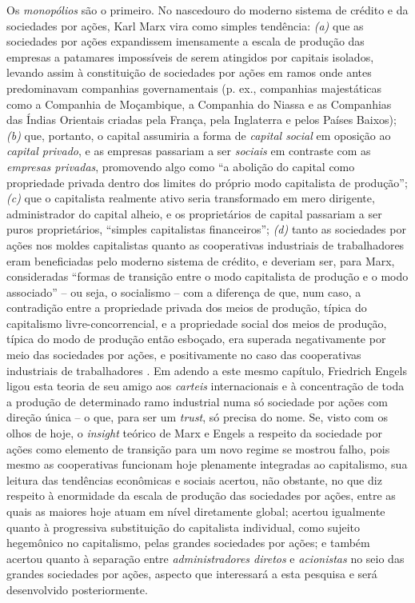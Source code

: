 Os \textit{monopólios} são o primeiro. No nascedouro do moderno sistema de crédito e da sociedades por ações, Karl Marx vira como simples tendência: \textit{(a)} que as sociedades por ações expandissem imensamente a escala de produção das empresas a patamares impossíveis de serem atingidos por capitais isolados, levando assim à constituição de sociedades por ações em ramos onde antes predominavam companhias governamentais (p. ex., companhias majestáticas como a Companhia de Moçambique, a Companhia do Niassa e as Companhias das Índias Orientais criadas pela França, pela Inglaterra e pelos Países Baixos); \textit{(b)} que, portanto, o capital assumiria a forma de \textit{capital social} em oposição ao \textit{capital privado}, e as empresas passariam a ser \textit{sociais} em contraste com as \textit{empresas privadas}, promovendo algo como ``a abolição do capital como propriedade privada dentro dos limites do próprio modo capitalista de produção''; \textit{(c)} que o capitalista realmente ativo seria transformado em mero dirigente, administrador do capital alheio, e os proprietários de capital passariam a ser puros proprietários, ``simples capitalistas financeiros''; \textit{(d)} tanto as sociedades por ações nos moldes capitalistas quanto as cooperativas industriais de trabalhadores eram beneficiadas pelo moderno sistema de crédito, e deveriam ser, para Marx, consideradas ``formas de transição entre o modo capitalista de produção e o modo associado'' -- ou seja, o socialismo -- com a diferença de que, num caso, a contradição entre a propriedade privada dos meios de produção, típica do capitalismo livre-concorrencial, e a propriedade social dos meios de produção, típica do modo de produção então esboçado, era superada negativamente por meio das sociedades por ações, e positivamente no caso das cooperativas industriais de trabalhadores \cite[p.~581-588]{MARX2008a}. Em adendo a este mesmo capítulo, Friedrich Engels ligou esta teoria de seu amigo aos \textit{carteis} internacionais e à concentração de toda a produção de determinado ramo industrial numa só sociedade por ações com direção única \cite[p.~584]{MARX2008a} -- o que, para ser um \textit{trust}, só precisa do nome. Se, visto com os olhos de hoje, o \textit{insight} teórico de Marx e Engels a respeito da sociedade por ações como elemento de transição para um novo regime se mostrou falho, pois mesmo as cooperativas funcionam hoje plenamente integradas ao capitalismo, sua leitura das tendências econômicas e sociais acertou, não obstante, no que diz respeito à enormidade da escala de produção das sociedades por ações, entre as quais as maiores hoje atuam em nível diretamente global; acertou igualmente quanto à progressiva substituição do capitalista individual, como sujeito hegemônico no capitalismo, pelas grandes sociedades por ações; e também acertou quanto à separação entre \textit{administradores diretos} e \textit{acionistas} no seio das grandes sociedades por ações, aspecto que interessará a esta pesquisa e será desenvolvido posteriormente. 

